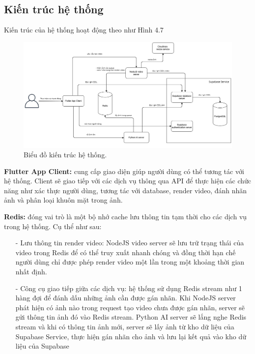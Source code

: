 \subsection{Kiến trúc hệ thống}

Kiến trúc của hệ thống hoạt động theo như Hình 4.7

\begin{figure}[H]
    \centering  
    \includegraphics[width=1.1\textwidth]{figures/c4/4_1/architechture.png}
    \caption{Biểu đồ kiến trúc hệ thống.}
    \label{fig:architecture_diagram}
\end{figure}

\textbf{Flutter App Client:} cung cấp giao diện giúp người dùng có thể tương tác với hệ thống. Client sẽ giao tiếp với các dịch vụ thông qua API để thực hiện các chức năng như xác thực người dùng, tương tác với database, render video, đánh nhãn ảnh và phân loại khuôn mặt trong ảnh.

\textbf{Redis:} đóng vai trò là một bộ nhớ cache lưu thông tin tạm thời cho các dịch vụ trong hệ thống. Cụ thể như sau: 
\begin{itemize}
    \item[-] Lưu thông tin render video: NodeJS video server sẽ lưu trữ trạng thái của video trong Redis để có thể truy xuất nhanh chóng và đồng thời hạn chế người dùng chỉ được phép render video một lần trong một khoảng thời gian nhất định.
    \item[-] Công cụ giao tiếp giữa các dịch vụ: hệ thống sử dụng Redis stream như 1 hàng đợi để đánh dấu những ảnh cần được gán nhãn. Khi NodeJS server phát hiện có ảnh nào trong request tạo video chưa được gán nhãn, server sẽ gửi thông tin ảnh đó vào Redis stream. Python AI server sẽ lắng nghe Redis stream và khi có thông tin ảnh mới, server sẽ lấy ảnh từ kho dữ liệu của Supabase Service, thực hiện gán nhãn cho ảnh và lưu lại kết quả vào kho dữ liệu của Supabase 
\end{itemize}

